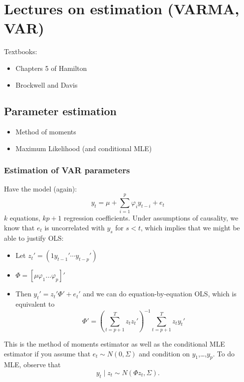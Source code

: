 
\chapter{Lectures on estimation (VARMA, VAR)}

Textbooks:
\begin{itemize}
\item Chapters 5 of Hamilton
\item Brockwell and Davis
\end{itemize}

\section{Parameter estimation}

\begin{itemize}
\item Method of moments
\item Maximum Likelihood (and conditional MLE)
\end{itemize}

\subsection{Estimation of VAR parameters}

Have the model (again):
\[y_t = μ + ∑_{i=1}^p φ_i y_{t-i} + e_t\] $k$ equations, $k p + 1$
regression coefficients. Under assumptions of causality, we know that
$e_t$ is uncorrelated with $y_s$ for $s < t$, which implies that we
might be able to justify OLS:
\begin{itemize}
\item Let $z_t' = (1 y_{t-1}' ⋯ y_{t-p}')$
\item $Φ = [ μ φ_1 … φ_p ]'$
\item Then $y_t' = z_t'Φ' + e_t'$ and we can do equation-by-equation
  OLS, which is equivalent to
  \[\hat Φ' = (∑_{t=p+1}^T z_t z_t')^{-1} ∑_{t=p+1}^T z_t y_t'\]
\end{itemize}

This is the method of moments estimator as well as the conditional MLE
estimator if you assume that $e_t ∼ N(0, Σ)$ and
condition on $y_1$,…,$y_p$. To do MLE, observe that
\[y_t ∣ z_t ∼ N(Φ z_t, Σ).\]

